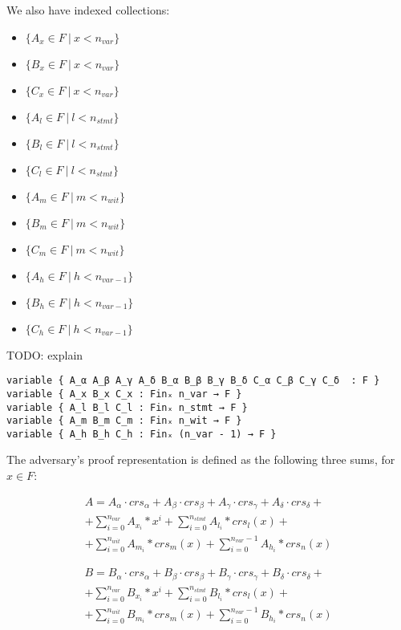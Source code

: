 \documentclass{article}
\theoremstyle{definition}
\theoremstyle{remark}
\begin{document}
We also have indexed collections:
\begin{itemize}
\item $\{ A_x \in F \: | \: x < n_{var} \}$
\item $\{ B_x \in F \: | \: x < n_{var} \}$
\item $\{ C_x \in F \: | \: x < n_{var} \}$
\item $\{ A_l \in F \: | \: l < n_{stmt} \}$
\item $\{ B_l \in F \: | \: l < n_{stmt} \}$
\item $\{ C_l \in F \: | \: l < n_{stmt} \}$
\item $\{ A_m \in F \: | \: m < n_{wit} \}$
\item $\{ B_m \in F \: | \: m < n_{wit} \}$
\item $\{ C_m \in F \: | \: m < n_{wit} \}$
\item $\{ A_h \in F \: | \: h < n_{var - 1} \}$
\item $\{ B_h \in F \: | \: h < n_{var - 1} \}$
\item $\{ C_h \in F \: | \: h < n_{var - 1} \}$
\end{itemize}
TODO: explain

\begin{lstlisting}
variable { A_α A_β A_γ A_δ B_α B_β B_γ B_δ C_α C_β C_γ C_δ  : F }
variable { A_x B_x C_x : Finₓ n_var → F }
variable { A_l B_l C_l : Finₓ n_stmt → F }
variable { A_m B_m C_m : Finₓ n_wit → F }
variable { A_h B_h C_h : Finₓ (n_var - 1) → F }
\end{lstlisting}

The adversary's proof representation is defined as the following three sums, for $x \in F$:

\begin{multline}
A = A_{\alpha} \cdot crs_{\alpha} + A_{\beta} \cdot crs_{\beta} + A_{\gamma} \cdot crs_{\gamma} + A_{\delta} \cdot crs_{\delta} + \\
    + \sum \limits_{i = 0}^{n_{var}} A_{x_i} * x^i + \sum \limits_{i = 0}^{n_{stmt}} A_{l_i} * crs_l(x) + \\
    + \sum \limits_{i = 0}^{n_{wit}} A_{m_i} * crs_m(x) + \sum \limits_{i = 0}^{n_{var} - 1} A_{h_i} * crs_n(x)
\end{multline}

\begin{multline}
B = B_{\alpha} \cdot crs_{\alpha} + B_{\beta} \cdot crs_{\beta} + B_{\gamma} \cdot crs_{\gamma} + B_{\delta} \cdot crs_{\delta} + \\
    + \sum \limits_{i = 0}^{n_{var}} B_{x_i} * x^i + \sum \limits_{i = 0}^{n_{stmt}} B_{l_i} * crs_l(x) + \\
    + \sum \limits_{i = 0}^{n_{wit}} B_{m_i} * crs_m(x) + \sum \limits_{i = 0}^{n_{var} - 1} B_{h_i} * crs_n(x)
\end{multline}
\end{document}
